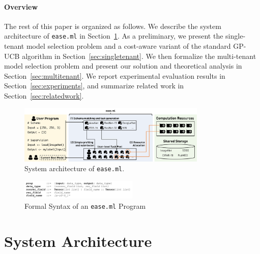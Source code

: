\documentclass[letterpaper]{vldb}
\newcommand{\eml}{\texttt{ease.ml}\xspace}
\begin{document}
\vspace{-0.5em}
\paragraph*{Overview}
The rest of this paper is organized as follows.
We describe the system architecture of \eml in Section~\ref{sec:architecture}.
As a preliminary, we present the single-tenant model selection problem and a cost-aware variant of the standard GP-UCB algorithm in Section~\ref{sec:singletenant}.
We then formalize the multi-tenant model selection problem and present our solution and theoretical analysis in Section~\ref{sec:multitenant}.
We report experimental evaluation results in Section~\ref{sec:experiments}, and summarize related work in Section~\ref{sec:relatedwork}.





\begin{figure}
\centering
\includegraphics[width=0.8\textwidth]{figures/easeml}
\vspace{-1em}
\caption{System architecture of \texttt{ease.ml}.}
\label{fig:architecture}
\vspace{-1em}
\end{figure}


\begin{figure}[t]
\centering
\includegraphics[width=0.5\textwidth]{figures/syntax}
\vspace{-2em}
\caption{Formal Syntax of an \eml Program}
\label{fig:syntax}
\vspace{-1em}
\end{figure}


\newpage
\vspace{-1em}
\section{System Architecture} \label{sec:architecture}
\end{document}
